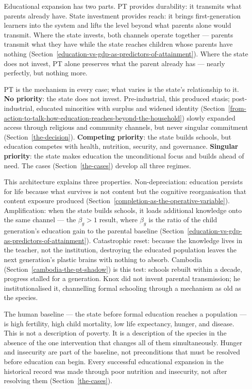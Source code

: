 \documentclass[12pt,letterpaper]{article}
\begin{document}
Educational expansion has two parts. PT provides durability: it
transmits what parents already have. State investment provides reach: it
brings first-generation learners into the system and lifts the level
beyond what parents alone would transmit. Where the state invests, both
channels operate together --- parents transmit what they have while the
state reaches children whose parents have nothing (Section~\ref{education-vs-gdp-as-predictors-of-attainment}). Where
the state does not invest, PT alone preserves what the parent already
has --- nearly perfectly, but nothing more.

PT is the mechanism in every case; what varies is the state's
relationship to it. \textbf{No priority}: the state does not invest. Pre-industrial, this
produced stasis; post-industrial, educated minorities with surplus and
widened identity (Section~\ref{from-action-to-talk-how-education-reaches-beyond-the-household}) slowly expanded access through religious
and community channels, but never singular commitment (Section~\ref{the-decision}).
\textbf{Competing priority}: the state builds schools, but education
competes with health, nutrition, security, and governance.
\textbf{Singular priority}: the state makes education the unconditional
focus and builds ahead of need. The cases (Section~\ref{the-cases}) develop all three
regimes.

This architecture explains three properties. Non-depreciation: education
persists for life because what survives is not content but the cognitive
reorganisation that content exposure produced
(Section~\ref{completion-as-the-operative-variable}). Amplification: when the state builds
schools, it loads additional knowledge onto the same channel --- the
$\beta_g > 1$ result, where $\beta_g$ is the ratio of the child
generation's education gain to the parental baseline
(Section~\ref{education-vs-gdp-as-predictors-of-attainment}). Catastrophic reset: because the
knowledge lives in the teacher, not the institution, destroying the
educated population leaves the next generation's plastic brains with
nothing to absorb. Cambodia (Section~\ref{cambodia-the-pt-shadow}) is this test: schools rebuilt
within a decade, progress stalled for a generation. Knox did not invent
parental transmission; he institutionalised it, channelling formal
schooling through a mechanism as old as the species.

The human baseline --- the state before formal education reaches a
population --- is high fertility, high child mortality, low life
expectancy, hunger, and disease. This is not a description of poverty.
It is a description of the species in the absence of the one
intervention that changes all of them simultaneously. Hunger and
insecurity are part of the baseline, not preconditions that must be
resolved before education can begin. Every successful educational
expansion in the historical record was made through poor nutrition and
insecurity, not after resolving them (Section~\ref{the-cases}).
\end{document}
